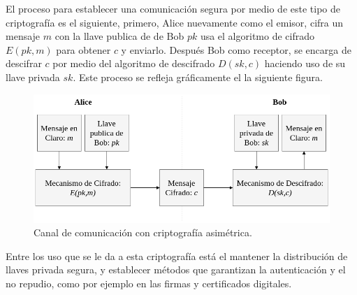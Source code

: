     El proceso para establecer una comunicación segura por medio de este tipo 
    de criptografía es el siguiente, primero, Alice nuevamente como el emisor, 
    cifra un mensaje $m$ con la llave publica de de Bob $pk$ usa el algoritmo 
    de cifrado $E(pk,m)$ para obtener $c$ y enviarlo. Después Bob como 
    receptor, se encarga de descifrar $c$ por medio del algoritmo de 
    descifrado $D(sk,c)$ haciendo uso de su llave privada $sk$. Este proceso 
    se refleja gráficamente el la siguiente figura.
  
    \begin{figure}[H]
      \begin{center}
        \includegraphics[width=0.8\linewidth]
          {contenidos/antecedentes/intro_img/cripto_asimetrica.png}
        \caption{Canal de comunicación con criptografía asimétrica.}
      \end{center}
    \end{figure}

    Entre los uso que se le da a esta criptografía está el mantener la 
    distribución de llaves privada segura, y establecer métodos que garantizan 
    la autenticación y el no repudio, como por ejemplo en las firmas y 
    certificados digitales.
